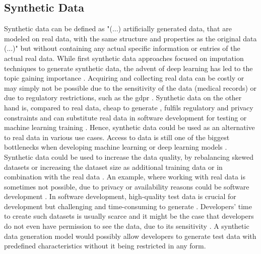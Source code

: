 \subsection{Synthetic Data}
\label{ch:preliminaries-dataSynthesis-syntheticData}
Synthetic data can be defined as "(...) artificially generated data, that are modeled on real data, with the same structure and properties as the original data (...)" \cite[p. 2]{kaloskampis2020SyntheticDataCivil} 
but without containing any actual specific information or entries of the actual real data. 
While first synthetic data approaches \cite{gelman1992InferenceIterativeSimulation} focused on imputation techniques to generate synthetic data, the advent of deep learning has led to the topic gaining importance \cite{kowalczyk2022TaxonomyUseSynthetic, kaloskampis2020SyntheticDataCivil}.
Acquiring and collecting real data can be costly \cite{panova2022HowSyntheticData} or may simply not be possible due to the sensitivity of the data (\eg medical records) \cite{esteban2017RealvaluedMedicalTimea} or due to regulatory restrictions, such as the \gls{gdpr}  \cite{european_commission_regulation_2016}.
Synthetic data on the other hand is, compared to real data, cheap to generate \cite{leminh2021AirGenGANbasedSynthetica}, fulfils regulatory and privacy constraints \cite{zhao2022CTABGANEnhancingTabular} and can substitute real data in software development for testing \cite{whiting2008CreatingRealisticScenariobased} or machine learning training \cite{panova2022HowSyntheticData}.
Hence, synthetic data could be used as an alternative to real data in various use cases.
Access to data is still one of the biggest bottlenecks when developing machine learning or deep learning models \cite{fan2020RelationalDataSynthesisa}.
Synthetic data could be used to increase the data quality, by rebalancing skewed datasets \cite{zhao2022CTABGANEnhancingTabular} 
or increasing the dataset size as additional training data or in combination with the real data \cite{leminh2021AirGenGANbasedSynthetica, kim2021OCTGANNeuralODEbased}.
An example, where working with real data is sometimes not possible, due to privacy or availability reasons could be software development \cite{9034117, whiting2008CreatingRealisticScenariobased}.
In software development, high-quality test data is crucial for development but challenging and time-consuming to generate \cite{whiting2008CreatingRealisticScenariobased}.
Developers' time to create such datasets is usually scarce and it might be the case that developers do not even have permission to see the data, due to its sensitivity \cite{whiting2008CreatingRealisticScenariobased}.
A synthetic data generation model would possibly allow developers to generate test data with predefined characteristics without it being restricted in any form.


